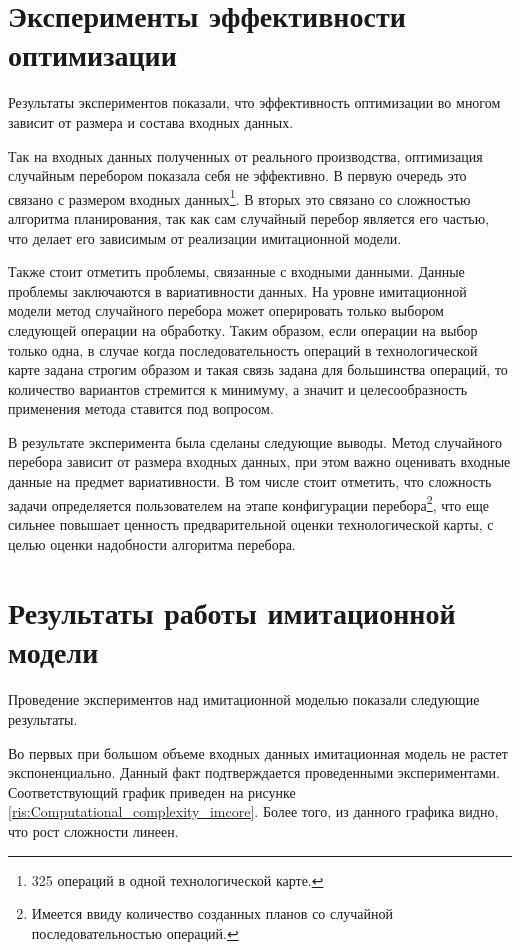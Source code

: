 \section*{Эксперименты эффективности оптимизации}
\label{experiment}
Результаты экспериментов показали, что эффективность оптимизации во многом зависит от размера и состава входных данных.

Так на входных данных полученных от реального производства, оптимизация случайным перебором показала себя не эффективно. В первую очередь это связано с размером входных данных\footnote{325 операций в одной технологической карте.}. В вторых это связано со сложностью алгоритма планирования, так как сам случайный перебор является его частью, что делает его зависимым от реализации имитационной модели.

Также стоит отметить проблемы, связанные с входными данными. Данные проблемы заключаются в вариативности данных. На уровне имитационной модели метод случайного перебора может оперировать только выбором следующей операции на обработку. Таким образом, если операции на выбор только одна, в случае когда последовательность операций в технологической карте задана строгим образом и такая связь задана для большинства операций, то количество вариантов стремится к минимуму, а значит и целесообразность применения метода ставится под вопросом.

В результате эксперимента была сделаны следующие выводы. Метод случайного перебора зависит от размера входных данных, при этом важно оценивать входные данные на предмет вариативности. В том числе стоит отметить, что сложность задачи определяется пользователем на этапе конфигурации перебора\footnote{Имеется ввиду количество созданных планов со случайной последовательностью операций.}, что еще сильнее повышает ценность предварительной оценки технологической карты, с целью оценки надобности алгоритма перебора.

\section{Результаты работы имитационной модели}

Проведение экспериментов над имитационной моделью показали следующие результаты.

Во первых при большом объеме входных данных имитационная модель не растет экспоненциально. Данный факт подтверждается проведенными экспериментами. Соответствующий график приведен на рисунке \ref{ris:Computational_complexity_imcore}.
Более того, из данного графика видно, что рост сложности линеен.

